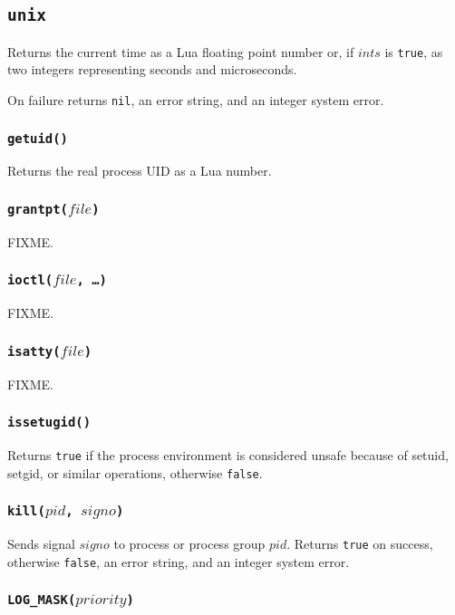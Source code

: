 \documentclass[11pt, oneside]{memoir}
\newcommand*{\true}[0]{\texttt{true}\xspace}
\newcommand*{\false}[0]{\texttt{false}\xspace}
\newcommand*{\nil}[0]{\texttt{nil}\xspace}
\newcommand*{\fn}[1]{\texttt{#1}\xspace}
\newcounter{toccols}
\newenvironment{Module}[1]{
	\subsection{\texttt{#1}}
	\addtocontents{toc}{
		\protect\begin{multicols}{\value{toccols}}
	}
}{
	\addtocontents{toc}{\protect\end{multicols}}
}
\begin{document}
\begin{Module}{unix}
Returns the current time as a Lua floating point number or, if $ints$ is \true, as two integers representing seconds and microseconds.

On failure returns \nil, an error string, and an integer system error.

\subsubsection[\fn{getuid}]{\fn{getuid()}}

Returns the real process UID as a Lua number.

\subsubsection[\fn{grantpt}]{\fn{grantpt($file$)}}

FIXME.

\subsubsection[\fn{ioctl}]{\fn{ioctl($file$, \ldots)}}

FIXME.

\subsubsection[\fn{isatty}]{\fn{isatty($file$)}}

FIXME.

\subsubsection[\fn{issetugid}]{\fn{issetugid()}}

Returns \true if the process environment is considered unsafe because of setuid, setgid, or similar operations, otherwise \false.

\subsubsection[\fn{kill}]{\fn{kill($pid$, $signo$)}}

Sends signal $signo$ to process or process group $pid$. Returns \true on success, otherwise \false, an error string, and an integer system error.

\subsubsection[\fn{LOG\_MASK}]{\fn{LOG\_MASK($priority$)}}


\end{Module}
\end{document}
